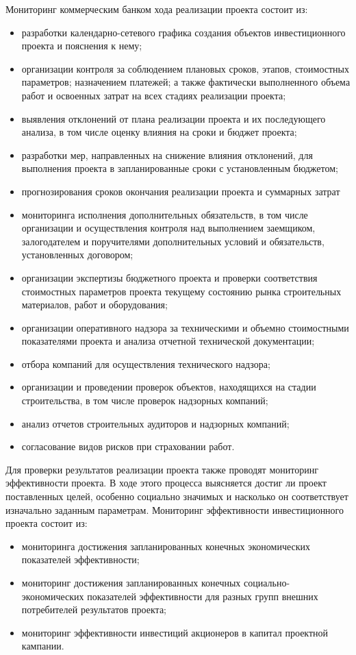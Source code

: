 \documentclass[12pt,a4paper]{article} %
\begin{document}
Мониторинг коммерческим банком хода реализации проекта состоит из:
\begin{itemize}
	\item разработки календарно-сетевого графика создания объектов инвестиционного проекта и пояснения к нему;
	\item организации контроля за соблюдением плановых сроков, этапов, стоимостных параметров; назначением платежей; а также фактически выполненного объема работ и освоенных затрат на всех стадиях реализации проекта;
	\item выявления отклонений от плана реализации проекта и их последующего анализа, в том числе оценку влияния на сроки и бюджет проекта;
	\item разработки мер, направленных на снижение влияния отклонений, для выполнения проекта в запланированные сроки с установленным бюджетом;
	\item прогнозирования сроков окончания реализации проекта и суммарных затрат
	\item мониторинга исполнения дополнительных обязательств, в том числе организации и осуществления контроля над выполнением заемщиком, залогодателем и поручителями дополнительных условий и обязательств, установленных договором;
	\item организации экспертизы бюджетного проекта и проверки соответствия стоимостных параметров проекта текущему состоянию рынка строительных материалов, работ и оборудования;
	\item организации оперативного надзора за техническими и объемно стоимостными показателями проекта и анализа отчетной технической документации;
	\item отбора компаний для осуществления технического надзора;
	\item организации и проведении проверок объектов, находящихся на стадии строительства, в том числе проверок надзорных компаний;
	\item анализ отчетов строительных аудиторов и надзорных компаний;
	\item согласование видов рисков при страховании работ. 
\end{itemize}

Для проверки результатов реализации проекта также проводят мониторинг эффективности проекта. 
В ходе этого процесса выясняется достиг ли проект поставленных целей, особенно социально значимых и насколько он соответствует изначально заданным параметрам.
Мониторинг эффективности инвестиционного проекта состоит из:
\begin{itemize}
	\item мониторинга достижения запланированных конечных экономических показателей эффективности;
	\item мониторинг достижения запланированных конечных социально-экономических показателей эффективности для разных групп внешних потребителей результатов проекта;
	\item мониторинг эффективности инвестиций акционеров в капитал проектной кампании.
\end{itemize}
\end{document}
